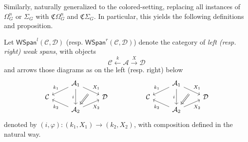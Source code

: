 \documentclass[a4paper,10pt
,draft
]{article}%
\renewcommand{\phi}{\varphi}
\newcommand{\UC}{\underline{\mathfrak C}}
\renewcommand{\1}{\ensuremath{\mathbb{id}}}
\begin{document}
Similarly, \cite[Prop 3.47, 3.90, 4.12, 4.15, 4.26, 4.28, 4.30]{BP17} naturally generalized to the colored-setting,
replacing all instances of $\Omega_G^n$ or $\Sigma_G$ with $\UC\Omega_G^n$ and $\UC\Sigma_G$.
In particular, this yields the following definitions and proposition.
\begin{definition}[{cf. \cite[Defn 4.3]{BP17}}]
      Let $\mathsf{WSpan}^l(\mathcal C, \mathcal D)$ (resp. $\mathsf{WSpan}^r(\mathcal C, \mathcal D)$)
      denote the category of \textit{left (resp. right) weak spans}, with objects
      \begin{equation}
            \mathcal C \xleftarrow{k} \mathcal A \xrightarrow{X} \mathcal D
      \end{equation}
      and arrows those diagrams as on the left (resp. right) below
      \begin{equation}
            \begin{tikzcd}[row sep = tiny]
                  & \mathcal A_1 \arrow[dr, "X_1", ""'{name=U}] \arrow[dl, "k_1"'] \arrow[dd, "i"']
                  &
                  &&
                  &
                  \mathcal A_1 \arrow[dr, "X_1", ""'{name=A}] \arrow[dl, "k_1"'] \arrow[dd, "i"']
                  \\
                  \mathcal C
                  &&
                  \mathcal D
                  &&
                  \mathcal C
                  &&
                  \mathcal D
                  \\
                  & |[alias=V]| \mathcal A_2 \arrow[ur, "X_2"'] \arrow[ul, "k_2"]
                  &
                  &&
                  &
                  |[alias=B]| \mathcal A_2 \arrow[ur, "X_2"'] \arrow[ul, "k_2"]
                  \arrow[Rightarrow, from = U, to = V]
                  \arrow[Rightarrow, from = A, to = B]
            \end{tikzcd}
      \end{equation}
      denoted by $(i,\phi): (k_1,X_1) \to (k_2,X_2)$, with composition defined in the natural way.      
\end{definition}

\end{document}
